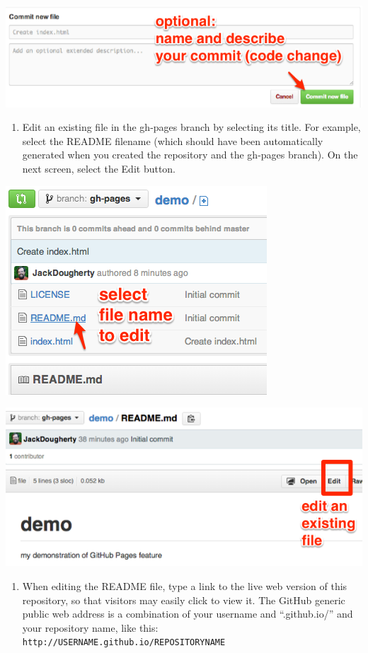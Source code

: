 \documentclass[
  english,
]{book}
\providecommand{\tightlist}{%
  \setlength{\itemsep}{0pt}\setlength{\parskip}{0pt}}
\begin{document}
\includegraphics{images/08-github/GitHub-CommitButton.png}

\begin{enumerate}
\def\labelenumi{\arabic{enumi})}
\setcounter{enumi}{6}
\tightlist
\item
  Edit an existing file in the gh-pages branch by selecting its title. For example, select the README filename (which should have been automatically generated when you created the repository and the gh-pages branch). On the next screen, select the Edit button.
\end{enumerate}

\includegraphics{images/08-github/GitHub-EditFile.png}

\includegraphics{images/08-github/GitHub-EditFile2.png}

\begin{enumerate}
\def\labelenumi{\arabic{enumi})}
\setcounter{enumi}{7}
\tightlist
\item
  When editing the README file, type a link to the live web version of this repository, so that visitors may easily click to view it. The GitHub generic public web address is a combination of your username and ``.github.io/'' and your repository name, like this: \texttt{http://USERNAME.github.io/REPOSITORYNAME}
\end{enumerate}
\end{document}
